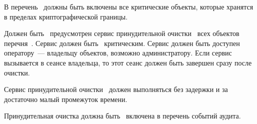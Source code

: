 \label{R.DE.Long}
В перечень~ должны быть включены все критические объекты, 
которые хранятся в пределах криптографической границы.

\label{R.DE.Service}
Должен быть~ предусмотрен сервис принудительной 
очистки~ всех объектов перечня~.
%
Сервис должен быть~ критическим.
%
Сервис должен быть доступен~ оператору~--- владельцу объектов,
возможно администратору.
%
Если сервис вызывается в сеансе владельца, то этот сеанс должен быть 
завершен сразу после очистки.

\label{R.DE.Fast}
Сервис принудительной очистки~ должен выполняться 
без задержки и за достаточно малый промежуток времени.

\label{R.DE.AU}
Принудительная очистка должна быть~ включена в перечень 
событий аудита.

